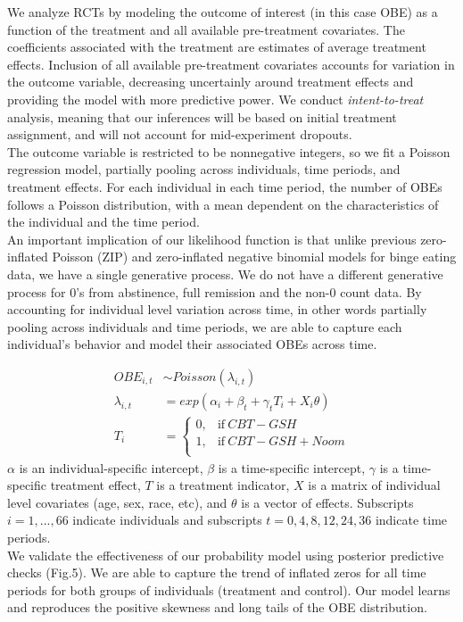\documentclass{article}
\begin{document}
We analyze RCTs by modeling the outcome of interest (in this case OBE) as a function of the treatment and all available pre-treatment covariates.  The coefficients associated with the treatment are estimates of average treatment effects.  Inclusion of all available pre-treatment covariates accounts for variation in the outcome variable, decreasing uncertainly around treatment effects and providing the model with more predictive power.  We conduct \emph{intent-to-treat} analysis, meaning that our inferences will be based on initial treatment assignment, and will not account for mid-experiment dropouts. \\
The outcome variable is restricted to be nonnegative integers, so we fit a Poisson regression model, partially pooling across individuals, time periods, and treatment effects. For each individual in each time period, the number of OBEs follows a Poisson distribution, with a mean dependent on the characteristics of the individual and the time period.  \\
An important implication of our likelihood function is that unlike previous zero-inflated Poisson (ZIP) and zero-inflated negative binomial models \cite{grotzinger2015benefits, hildebrandt2017randomized} for binge eating data, we have a single generative process. We do not have a different generative process for 0's from abstinence, full remission and the non-0 count data. By accounting for individual level variation across time, in other words partially pooling \cite{gelman2014bayesian} across individuals and time periods, we are able to capture each individual's behavior and model their associated OBEs across time.

\begin{align}
OBE_{i,t} &\sim Poisson(\lambda_{i,t}) \\
\lambda_{i,t} &= exp(\alpha_i + \beta_t + \gamma_tT_i + X_i\theta) \\
T_i &=
    \begin{cases}
      0, & \text{if}\ CBT-GSH \\
      1, & \text{if}\ CBT-GSH + Noom \\
    \end{cases}
\end{align}
$\alpha$ is an individual-specific intercept, $\beta$ is a time-specific intercept, $\gamma$ is a time-specific treatment effect, $T$ is a treatment indicator, $X$ is a matrix of individual level covariates (age, sex, race, etc), and $\theta$ is a vector of effects. Subscripts $i = 1, ..., 66$ indicate individuals and subscripts $t = 0, 4, 8, 12, 24, 36$ indicate time periods.\\
We validate the effectiveness of our probability model using posterior predictive checks (Fig.5). We are able to capture the trend of inflated zeros for all time periods for both groups of individuals (treatment and control). Our model learns and reproduces the positive skewness and long tails of the OBE distribution.
\end{document}
